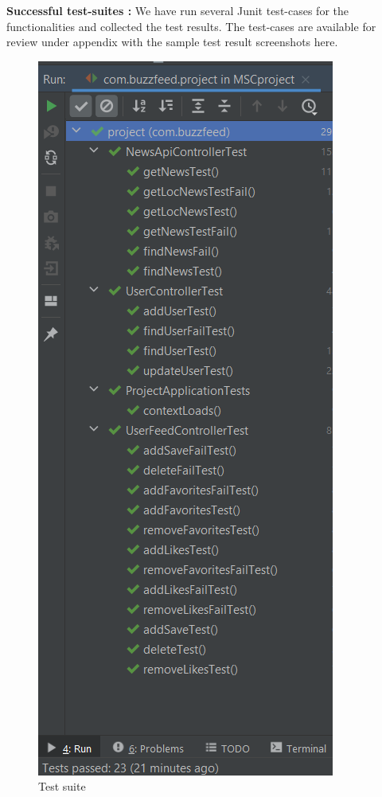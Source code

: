\textbf{Successful test-suites : } \newline
 We have run several Junit test-cases for the functionalities and collected the test results. The test-cases are available for review under appendix with the sample test result screenshots here. 
 

 \begin{figure}[h!]
     \begin{center}
    \includegraphics[scale=1]{images/testcases.PNG} 
  \end{center}
\centering \caption{Test suite}

\end{figure}

 
 



 
 